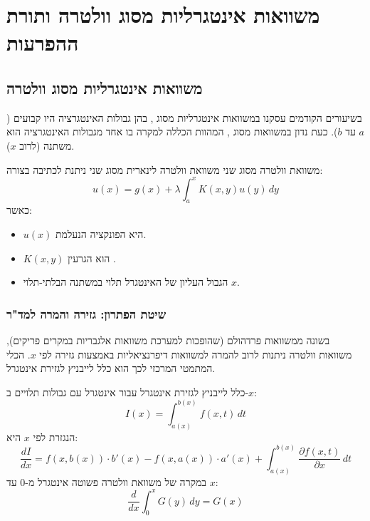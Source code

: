 \section{משוואות אינטגרליות מסוג וולטרה ותורת ההפרעות}

\subsection{משוואות אינטגרליות מסוג וולטרה }
בשיעורים הקודמים עסקנו במשוואות אינטגרליות מסוג , בהן גבולות האינטגרציה היו קבועים ($a$ עד $b$). כעת נדון במשוואות מסוג , המהוות הכללה למקרה בו אחד מגבולות האינטגרציה הוא משתנה (לרוב $x$).

\begin{definitionbox}{משוואת וולטרה מסוג שני}
משוואת וולטרה לינארית מסוג שני ניתנת לכתיבה בצורה:
\[
u(x) = g(x) + \lambda \int_{a}^{x} K(x,y) u(y) \, dy
\]
כאשר:
\begin{itemize}
    \item $u(x)$ היא הפונקציה הנעלמת.
    \item $K(x,y)$ הוא הגרעין .
    \item הגבול העליון של האינטגרל תלוי במשתנה הבלתי-תלוי $x$.
\end{itemize}
\end{definitionbox}

\subsubsection{שיטת הפתרון: גזירה והמרה למד"ר}
בשונה ממשוואות פרדהולם (שהופכות למערכת משוואות אלגבריות במקרים פריקים), משוואות וולטרה ניתנות לרוב להמרה למשוואות דיפרנציאליות באמצעות גזירה לפי $x$. הכלי המתמטי המרכזי לכך הוא כלל לייבניץ לגזירת אינטגרל.

\begin{theorembox}{כלל לייבניץ לגזירת אינטגרל }
עבור אינטגרל עם גבולות תלויים ב-$x$:
\[
I(x) = \int_{a(x)}^{b(x)} f(x,t) \, dt
\]
הנגזרת לפי $x$ היא:
\[
\frac{dI}{dx} = f(x, b(x)) \cdot b'(x) - f(x, a(x)) \cdot a'(x) + \int_{a(x)}^{b(x)} \frac{\partial f(x,t)}{\partial x} \, dt
\]
במקרה של משוואת וולטרה פשוטה אינטגרל מ-$0$ עד $x$:
\[
\frac{d}{dx} \int_{0}^{x} G(y) \, dy = G(x)
\]
\end{theorembox}

